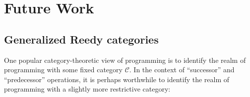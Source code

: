 \chapter{Future Work}

\section{Generalized Reedy categories}


One popular category-theoretic view of programming is to identify the realm of
programming with some fixed category $\mathcal{C}$. In the context of
``successor'' and ``predecessor'' operations, it is perhaps worthwhile to
identify the realm of programming with a slightly more restrictive category:

